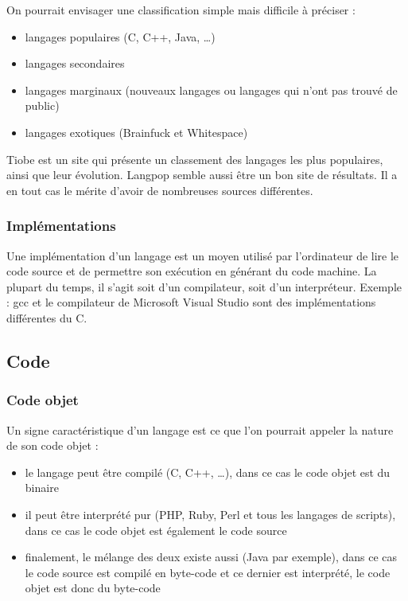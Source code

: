 On pourrait envisager une classification simple mais difficile à préciser :
\begin{itemize}
\item langages populaires (C, C++, Java, …)
\item langages secondaires
\item langages marginaux (nouveaux langages ou langages qui n'ont pas trouvé de public)
\item langages exotiques (Brainfuck et Whitespace)\\
\end{itemize}

Tiobe \cite{bib_tiobe} est un site qui présente un classement des langages les plus populaires, ainsi que leur évolution.
Langpop \cite{bib_langpop} semble aussi être un bon site de résultats. Il a en tout cas le mérite d'avoir de nombreuses sources différentes.

\subsubsection{Implémentations}
\label{implementations}

Une implémentation d'un langage est un moyen utilisé par l'ordinateur de lire le code source et de permettre son exécution en générant du code machine. La plupart du temps, il s'agit soit d'un compilateur, soit d'un interpréteur. Exemple : gcc et le compilateur de Microsoft Visual Studio sont des implémentations différentes du C. \cite{bib_compl}

\subsection{Code}
\label{code}

\subsubsection{Code objet}
\label{objet}

Un signe caractéristique d'un langage est ce que l'on pourrait appeler la nature de son code objet :
\begin{itemize}
\item le langage peut être compilé (C, C++, …), dans ce cas le code objet est du binaire
\item il peut être interprété pur (PHP, Ruby, Perl et tous les langages de scripts), dans ce cas le code objet est également le code source
\item finalement, le mélange des deux existe aussi (Java par exemple), dans ce cas le code source est compilé en byte-code et ce dernier est interprété, le code objet est donc du byte-code
\end{itemize}

